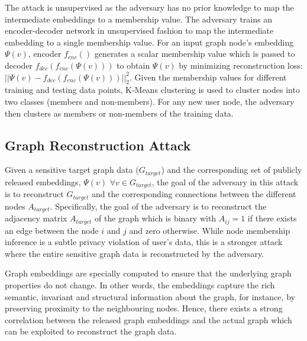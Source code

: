 The attack is unsupervised as the adversary has no prior knowledge to map the intermediate embeddings to a membership value. %
The adversary trains an encoder-decoder network in unsupervised fashion to map the intermediate embedding to a single membership value.
For an input graph node's embedding $\Psi (v)$, encoder $f_{enc}()$ generates a scalar membership value which is passed to decoder $f_{dec}(f_{enc}(\Psi (v)))$ to obtain $\Psi(v)$ by minimizing reconstruction loss: $||\Psi (v) - f_{dec}(f_{enc}(\Psi (v)))||_2^2$.
Given the membership values for different training and testing data points, K-Means clustering is used to cluster nodes into two classes (members and non-members).
For any new user node, the adversary then clusters as members or non-members of the training data.









\subsection{Graph Reconstruction Attack}

Given a sensitive target graph data ($G_{target}$) and the corresponding set of publicly released embeddings, $\Psi (v)$ $\forall v \in G_{target}$, the goal of the adversary in this attack is to reconstruct $G_{target}$ and the corresponding connections between the different nodes $A_{target}$.
Specifically, the goal of the adversary is to reconstruct the adjacency matrix $A_{target}$ of the graph which is binary with $A_{ij}=1$ if there exists an edge between the node $i$ and $j$ and zero otherwise.
While node membership inference is a subtle privacy violation of user's data, this is a stronger attack where the entire sensitive graph data is reconstructed by the adversary.

Graph embeddings are specially computed to ensure that the underlying graph properties do not change.
In other words, the embeddings capture the rich semantic, invariant and structural information about the graph, for instance, by preserving proximity to the neighbouring nodes.
Hence, there exists a strong correlation between the released graph embeddings and the actual graph which can be exploited to reconstruct the graph data.

